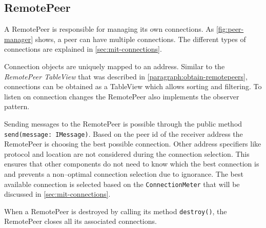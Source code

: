 \subsection{RemotePeer}\label{sec:mit-remotePeer}
A RemotePeer is responsible for managing its own connections. As \vref{fig:peer-manager} shows, a peer can have multiple connections. The different types of connections are explained in \vref{sec:mit-connections}.

Connection objects are uniquely mapped to an address. Similar to the \textit{RemotePeer TableView} that was described in \vref{paragraph:obtain-remotepeers}, connections can be obtained as a TableView which allows sorting and filtering. To listen on connection changes the RemotePeer also implements the observer pattern.

Sending messages to the RemotePeer is possible through the public method \lstinline[breaklines=false]|send(message: IMessage)|. Based on the peer id of the receiver address the RemotePeer is choosing the best possible connection. Other address specifiers like protocol and location are not considered during the connection selection. This ensures that other components do not need to know which the best connection is and prevents a non–optimal connection selection due to ignorance.
The best available connection is selected based on the \lstinline|ConnectionMeter| that will be discussed in \vref{sec:mit-connections}.

When a RemotePeer is destroyed by calling its method \lstinline|destroy()|, the RemotePeer closes all its associated connections.
